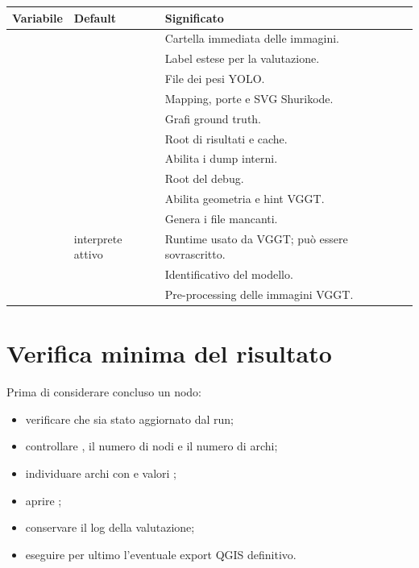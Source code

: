 \begin{longtable}{P{0.34\textwidth}P{0.18\textwidth}P{0.35\textwidth}}
\toprule
\textbf{Variabile} & \textbf{Default} & \textbf{Significato}\\
\midrule\endhead
{} &  & Cartella immediata delle immagini.\\
 &  & Label estese per la valutazione.\\
 &  & File dei pesi YOLO.\\
 &  & Mapping, porte e SVG Shurikode.\\
 &  & Grafi ground truth.\\
 &  & Root di risultati e cache.\\
 &  & Abilita i dump interni.\\
 &  & Root del debug.\\
 &  & Abilita geometria e hint VGGT.\\
 &  & Genera i file  mancanti.\\
 & interprete attivo & Runtime usato da VGGT; può essere sovrascritto.\\
 &  & Identificativo del modello.\\
 &  & Pre-processing delle immagini VGGT.\\
\bottomrule
\end{longtable}

\section{Verifica minima del risultato}

Prima di considerare concluso un nodo:

\begin{itemize}
  \item verificare che  sia stato aggiornato dal run;
  \item controllare , il numero di nodi e il numero di archi;
  \item individuare archi con  e valori
        ;
  \item aprire ;
  \item conservare il log della valutazione;
  \item eseguire per ultimo l'eventuale export QGIS definitivo.
\end{itemize}
